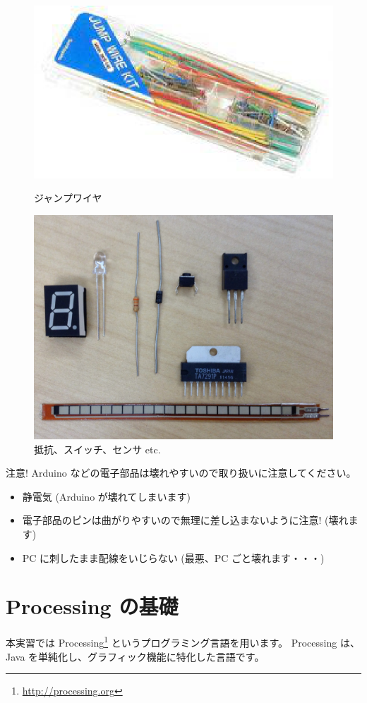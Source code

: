 \documentclass[11pt,a4paper]{jarticle}
\begin{document}
\begin{figure}[h!]
 \begin{minipage}{0.5\columnwidth}
  \centering
  \includegraphics[height=0.4\columnwidth]{img/jumpwire.eps}
  \caption{ジャンプワイヤ}
 \end{minipage}
 \begin{minipage}{0.5\columnwidth}
  \centering
  \includegraphics[height=0.4\columnwidth]{img/parts.eps}
  \caption{抵抗、スイッチ、センサ etc.}
 \end{minipage}
\end{figure}

\begin{itembox}{注意!}
 Arduino などの電子部品は壊れやすいので取り扱いに注意してください。
 \begin{itemize}
  \item 静電気 (Arduino が壊れてしまいます)
  \item 電子部品のピンは曲がりやすいので無理に差し込まないように注意! (壊れます)
  \item PC に刺したまま配線をいじらない (最悪、PC ごと壊れます・・・)
 \end{itemize}
\end{itembox}


\section{Processing の基礎}
本実習では Processing\footnote{\url{http://processing.org}} というプログラミング言語を用います。
Processing は、Java を単純化し、グラフィック機能に特化した言語です。
\end{document}
